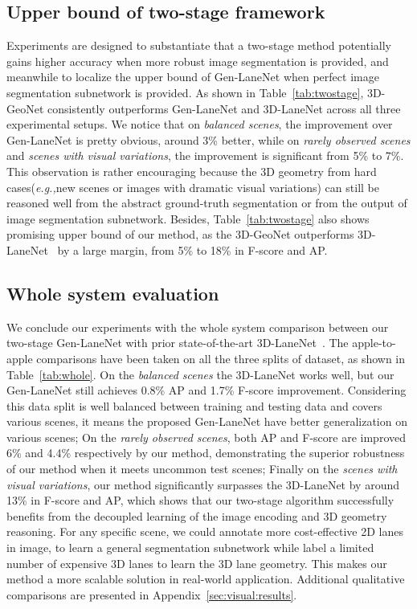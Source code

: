 \documentclass[10pt,twocolumn,letterpaper]{article}
\begin{document}
\subsection{Upper bound of two-stage framework}

Experiments are designed to substantiate that a two-stage method potentially gains higher accuracy when more robust image segmentation is provided, and meanwhile to localize the upper bound of Gen-LaneNet when perfect image segmentation subnetwork is provided. As shown in Table~\ref{tab:twostage}, 3D-GeoNet consistently outperforms Gen-LaneNet and 3D-LaneNet across all three experimental setups. We notice that on {\it balanced scenes}, the improvement over Gen-LaneNet is pretty obvious, around 3\% better, while on {\it rarely observed scenes} and {\it scenes with visual variations}, the improvement is significant from 5\% to 7\%. This observation is rather encouraging because the 3D geometry from hard cases({\it e.g.,}new scenes or images with dramatic visual variations) can still be reasoned well from the abstract ground-truth segmentation or from the output of image segmentation subnetwork. Besides, Table~\ref{tab:twostage} also shows promising upper bound of our method, as the 3D-GeoNet outperforms 3D-LaneNet~\cite{Garnett:etal:ICCV2019} by a large margin, from 5\% to 18\% in F-score and AP.


\subsection{Whole system evaluation}

We conclude our experiments with the whole system comparison between our two-stage Gen-LaneNet with prior state-of-the-art 3D-LaneNet~\cite{Garnett:etal:ICCV2019}. The apple-to-apple comparisons have been taken on all the three splits of dataset, as shown in Table~\ref{tab:whole}. On the {\it balanced scenes} the 3D-LaneNet works well, but our Gen-LaneNet  still achieves  0.8\% AP and 1.7\% F-score improvement. Considering this data split is well balanced between training and testing data and covers various scenes, it means the proposed Gen-LaneNet have better generalization on various scenes; On the  {\it rarely observed scenes}, both AP and F-score are improved 6\% and 4.4\% respectively by our method, demonstrating the superior robustness of our method when it meets uncommon test scenes; Finally on the {\it scenes with visual variations}, our method significantly surpasses the 3D-LaneNet by around 13\% in F-score and AP, which shows that our two-stage algorithm successfully benefits from the decoupled learning of the image encoding and 3D geometry reasoning. For any specific scene, we could annotate more cost-effective 2D lanes in image, to learn a general segmentation subnetwork while label a limited number of expensive 3D lanes to learn the 3D lane geometry. This makes our method a more scalable solution in real-world application. Additional qualitative comparisons are presented in Appendix~\ref{sec:visual:results}.
\end{document}
